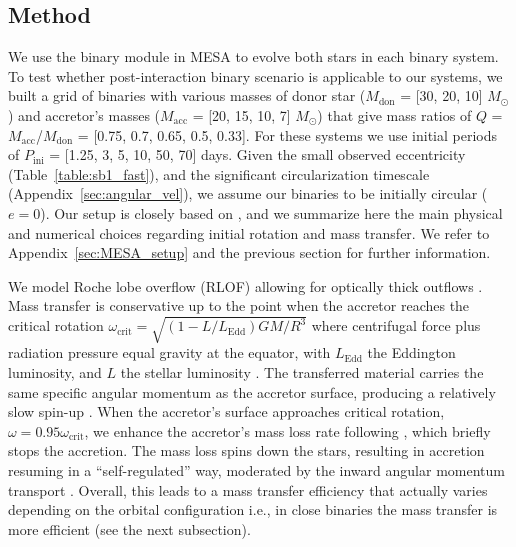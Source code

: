 \documentclass{aa}
\DeclareRobustCommand{\Tabref}[1]{Table~\ref{#1}}
\DeclareRobustCommand{\Appref}[1]{Appendix~\ref{#1}}
\begin{document}
\subsection{Method}

We use the binary module in MESA to evolve both stars in each binary system. To test whether post-interaction binary scenario is applicable to our systems, we
built a grid of binaries with various masses of donor star ($M_\mathrm{don}$ = [30, 20, 10] $M_{\odot}$) and accretor's masses ($M_\mathrm{acc}$ = [20, 15, 10, 7] $M_{\odot}$) that give mass ratios of $Q$ =
$M_\mathrm{acc}$/$M_\mathrm{don}$ = [0.75, 0.7, 0.65, 0.5, 0.33]. %
For these systems we use initial periods of $P_\mathrm{ini}$ = [1.25, 3, 5, 10, 50, 70] days. Given the small observed
  eccentricity (\Tabref{table:sb1_fast}), and the significant circularization timescale (\Appref{sec:angular_vel}), we assume our binaries
  to be initially circular ($e=0$). Our setup is closely based
  on \cite{Renzo_2021, renzo:23}, and we summarize here the main
  physical and numerical choices regarding initial rotation and mass transfer.
  We refer to \Appref{sec:MESA_setup} and the previous section for
  further information.

We model Roche lobe overflow (RLOF) allowing
  for optically thick outflows \citep{Kolb_1990}. Mass
transfer is conservative up to the point when the
accretor reaches the critical rotation
$\omega_\mathrm{crit}=\sqrt{(1-L/L_\mathrm{Edd})GM/R^3}$ where centrifugal force plus radiation pressure equal
  gravity at the equator, with $L_\mathrm{Edd}$ the Eddington
  luminosity, and $L$ the stellar luminosity \citep[e.g.,][]{Petrovic_2005,Heuvel_2017}. The transferred
  material carries the same specific angular momentum as the accretor
  surface, producing a relatively slow spin-up \citep{Renzo_2021}.
When the accretor's surface approaches critical
  rotation, $\omega = 0.95\omega_\mathrm{crit}$, we enhance the
  accretor's mass loss rate following \cite{langer:98}, which briefly
  stops the accretion. The mass loss spins down the stars, resulting in
  accretion resuming in a ``self-regulated'' way, moderated by the
  inward angular momentum transport \citep[e.g.,][]{Renzo_2021}. Overall, this leads
  to a mass transfer efficiency \citep[$\eta =\Delta M_\mathrm{acc}/\Delta M_\mathrm{don}$ as it has been introduced in][]{Soberman_1997} that actually varies depending on the orbital configuration i.e., in close binaries the mass transfer is more efficient (see the next subsection).
\end{document}

